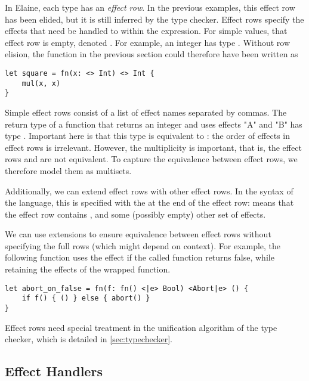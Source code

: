 In Elaine, each type has an \emph{effect row}. In the previous examples, this effect row has been elided, but it is still inferred by the type checker. Effect rows specify the effects that need be handled to within the expression. For simple values, that effect row is empty, denoted \el{<>}. For example, an integer has type . Without row elision, the  function in the previous section could therefore have been written as

\begin{lstlisting}[language=elaine, style=fancy]
let square = fn(x: <> Int) <> Int {
    mul(x, x)
}
\end{lstlisting}

Simple effect rows consist of a list of effect names separated by commas. The return type of a function that returns an integer and uses effects "A" and "B" has type . Important here is that this type is equivalent to : the order of effects in effect rows is irrelevant. However, the multiplicity is important, that is,  the effect rows  and  are not equivalent. To capture the equivalence between effect rows, we therefore model them as multisets.

Additionally, we can extend effect rows with other effect rows. In the syntax of the language, this is specified with the \el{|} at the end of the effect row:  means that the effect row contains ,  and some (possibly empty) other set of effects.

We can use extensions to ensure equivalence between effect rows without specifying the full rows (which might depend on context). For example, the following function uses the  effect if the called function returns false, while retaining the effects of the wrapped function.

\begin{lstlisting}[language=elaine, style=fancy]
let abort_on_false = fn(f: fn() <|e> Bool) <Abort|e> () {
    if f() { () } else { abort() }
}
\end{lstlisting}

Effect rows need special treatment in the unification algorithm of the type checker, which is detailed in \cref{sec:typechecker}.

\subsection{Effect Handlers}\label{sec:alghandlers}

